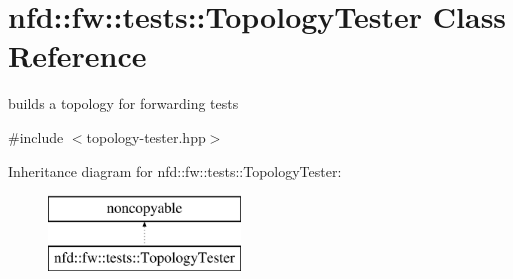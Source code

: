 \hypertarget{classnfd_1_1fw_1_1tests_1_1TopologyTester}{}\section{nfd\+:\+:fw\+:\+:tests\+:\+:Topology\+Tester Class Reference}
\label{classnfd_1_1fw_1_1tests_1_1TopologyTester}


builds a topology for forwarding tests  




{\ttfamily \#include $<$topology-\/tester.\+hpp$>$}

Inheritance diagram for nfd\+:\+:fw\+:\+:tests\+:\+:Topology\+Tester\+:\begin{figure}[H]
\begin{center}
\leavevmode
\includegraphics[height=2.000000cm]{classnfd_1_1fw_1_1tests_1_1TopologyTester}
\end{center}
\end{figure}
